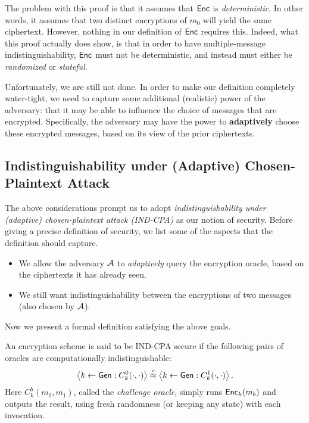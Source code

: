\documentclass[11pt]{article}
\begin{document}
\begin{answer}
  The problem with this proof is that it assumes that \(\mathsf{Enc}\) is
  \emph{deterministic}. In other words, it assumes that two distinct
  encryptions of \(m_0\) will yield the same ciphertext. However,
  nothing in our definition of \(\mathsf{Enc}\) requires this. Indeed, what
  this proof actually does show, is that in order to have
  multiple-message indistinguishability, \(\mathsf{Enc}\) must not be
  deterministic, and instead must either be \emph{randomized} or
  \emph{stateful}.
\end{answer}

Unfortunately, we are still not done.  In order to make our definition
completely water-tight, we need to capture some additional (realistic)
power of the adversary: that it may be able to influence the choice of
messages that are encrypted.  Specifically, the adversary may have the
power to \textbf{adaptively} choose these encrypted messages, based on
its view of the prior ciphertexts. 

\subsection{Indistinguishability under (Adaptive) Chosen-Plaintext Attack}
\label{sec:indist-under-chos}

The above considerations prompt us to adopt
\textit{indistinguishability under (adaptive) chosen-plaintext attack
  (IND-CPA)} as our notion of security.  Before giving a precise
definition of security, we list some of the aspects that the
definition should capture.

\begin{itemize}
\item We allow the adversary $\mathcal{A}$ to \emph{adaptively} query the
  encryption oracle, based on the ciphertexts it has already seen.
\item We still want indistinguishability between the encryptions of
  two messages (also chosen by $\mathcal{A}$).
\end{itemize}

Now we present a formal definition satisfying the above goals.

\begin{definition}
  \label{def:ind-cpa}
  An encryption scheme is said to be IND-CPA secure if the following
  pairs of oracles are computationally indistinguishable:
  \[ \left\langle k \gets \mathsf{Gen} : C^0_k(\cdot, \cdot) \right\rangle
  \stackrel{c}{\approx} \left\langle k \gets \mathsf{Gen} : C^1_k(\cdot, \cdot)
  \right\rangle. \] Here $C^{b}_{k}(m_{0}, m_{1})$, called the
  \emph{challenge oracle}, simply runs $\mathsf{Enc}_{k}(m_{b})$ and
  outputs the result, using fresh randomness (or keeping any state)
  with each invocation.
\end{definition}
\end{document}

